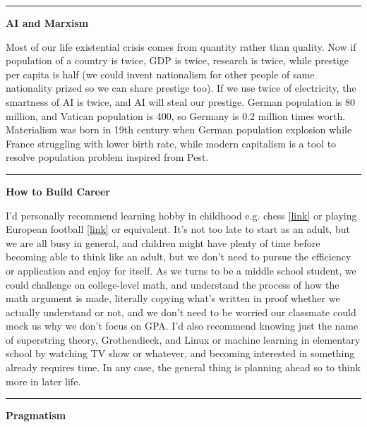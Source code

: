 \documentclass{article}
\begin{document}
\noindent\rule{\textwidth}{0.4pt}

\noindent
\textbf{AI and Marxism}

\noindent
Most of our life existential crisis comes from quantity rather than quality.
Now if population of a country is twice, GDP is twice, research is twice, while prestige per capita is half
(we could invent nationalism for other people of same nationality prized so we can share prestige too). 
If we use twice of electricity, the smartness of AI is twice, and AI will steal our prestige.
German population is 80 million, and Vatican population is 400, so Germany is 0.2 million times worth.
Materialism was born in 19th century when German population explosion while France struggling with lower birth rate,
while modern capitalism is a tool to resolve population problem inspired from Pest. \\




\noindent\rule{\textwidth}{0.4pt}

\noindent
\textbf{How to Build Career}

\noindent
I'd personally recommend learning hobby in childhood e.g. chess 
\href{https://jweekly.com/2020/01/13/sunnyvale-man-a-resolute-organ-donor-gives-liver-to-rabbi-he-doesnt-know/}{[link]}
or playing European football 
\href{https://www.cbssports.com/soccer/news/president-donald-trumps-son-barron-plays-for-d-c-united-youth-team-as-a-midfielder/}{[link]}
or equivalent.
It's not too late to start as an adult, but we are all busy in general, and children might have plenty of time
before becoming able to think like an adult, but we don't need to pursue the efficiency or application and enjoy for itself.
As we turns to be a middle school student, we could challenge on college-level math, 
and understand the process of how the math argument is made, literally copying what's written in proof whether we actually understand or not,
and we don't need to be worried our classmate could mock us why we don't focus on GPA.
I'd also recommend knowing just the name of superstring theory, Grothendieck, and Linux or machine learning in elementary school
by watching TV show or whatever, and becoming interested in something already requires time. 
In any case, the general thing is planning ahead so to think more in later life. \\



\noindent\rule{\textwidth}{0.4pt}

\noindent
\textbf{Pragmatism}
\end{document}
